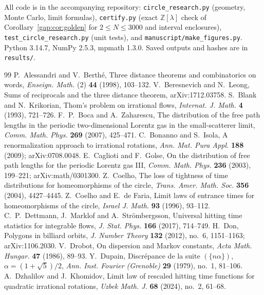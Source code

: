 \documentclass[11pt]{amsart}
\theoremstyle{remark}
\begin{document}
All code is in the accompanying repository: \texttt{circle\_research.py} (geometry,
Monte Carlo, limit formulas), \texttt{certify.py} (exact $\mathbb Z[\lambda]$ check of
Corollary~\ref{gap:cor:golden} for $2\le N\le3000$ and interval enclosures),
\texttt{test\_circle\_research.py} (unit tests), and \texttt{manuscript/make\_figures.py}.
Python 3.14.7, NumPy 2.5.3, mpmath 1.3.0. Saved outputs and hashes are in
\texttt{results/}.

\begin{thebibliography}{99}
 P.~Alessandri and V.~Berth\'e, Three distance theorems and combinatorics on words, \emph{Enseign. Math.} (2) \textbf{44} (1998), 103--132.
 V.~Beresnevich and N.~Leong, Sums of reciprocals and the three distance theorem, arXiv:1712.03758.
 S.~Blank and N.~Krikorian, Thom's problem on irrational flows, \emph{Internat. J. Math.} \textbf{4} (1993), 721--726.
 F.~P.~Boca and A.~Zaharescu, The distribution of the free path lengths in the periodic two-dimensional Lorentz gas in the small-scatterer limit, \emph{Comm. Math. Phys.} \textbf{269} (2007), 425--471.
 C.~Bonanno and S.~Isola, A renormalization approach to irrational rotations, \emph{Ann. Mat. Pura Appl.} \textbf{188} (2009); arXiv:0708.0048.
 E.~Caglioti and F.~Golse, On the distribution of free path lengths for the periodic Lorentz gas III, \emph{Comm. Math. Phys.} \textbf{236} (2003), 199--221; arXiv:math/0301300.
 Z.~Coelho, The loss of tightness of time distributions for homeomorphisms of the circle, \emph{Trans. Amer. Math. Soc.} \textbf{356} (2004), 4427--4445.
 Z.~Coelho and E.~de Faria, Limit laws of entrance times for homeomorphisms of the circle, \emph{Israel J. Math.} \textbf{93} (1996), 93--112.
 C.~P.~Dettmann, J.~Marklof and A.~Str\"ombergsson, Universal hitting time statistics for integrable flows, \emph{J. Stat. Phys.} \textbf{166} (2017), 714--749.
 H.~Don, Polygons in billiard orbits, \emph{J. Number Theory} \textbf{132} (2012), no.~6, 1151--1163; arXiv:1106.2030.
 V.~Drobot, On dispersion and Markov constants, \emph{Acta Math. Hungar.} \textbf{47} (1986), 89--93.
 Y.~Dupain, Discr\'epance de la suite $(\{n\alpha\})$, $\alpha=(1+\sqrt5)/2$, \emph{Ann. Inst. Fourier (Grenoble)} \textbf{29} (1979), no.~1, 81--106.
 A.~Dzhalilov and J.~Khomidov, Limit law of rescaled hitting time functions for quadratic irrational rotations, \emph{Uzbek Math. J.} \textbf{68} (2024), no.~2, 61--68.

\end{thebibliography}
\end{document}
